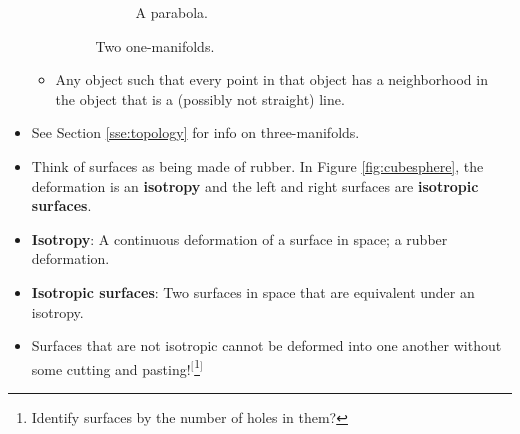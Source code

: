\documentclass[titlepage]{article}
\numberwithin{figure}{section}
\numberwithin{table}{section}
\numberwithin{equation}{section}
\begin{document}
\begin{itemize}
\begin{itemize}
\begin{figure}[h!]
\begin{subfigure}[b]{0.2\linewidth}
                \caption{A parabola.}
                \label{fig:1manifoldsb}
            \end{subfigure}
            \caption{Two one-manifolds.}
            \label{fig:1manifolds}
        \end{figure}
        \item Any object such that every point in that object has a neighborhood in the object that is a (possibly not straight) line.
    \end{itemize}
    \item See Section \ref{sse:topology} for info on three-manifolds.
    \item Think of surfaces as being made of rubber. In Figure \ref{fig:cubesphere}, the deformation is an \textbf{isotropy} and the left and right surfaces are \textbf{isotropic surfaces}.
    \item \textbf{Isotropy}: A continuous deformation of a surface in space; a rubber deformation.
    \item \textbf{Isotropic surfaces}: Two surfaces in space that are equivalent under an isotropy.
    \item Surfaces that are not isotropic cannot be deformed into one another without some cutting and pasting!$^[$\footnote{Identify surfaces by the number of holes in them?}$^]$
    \begin{figure}[h!]
        \centering
\end{figure}
\end{itemize}
\end{document}
